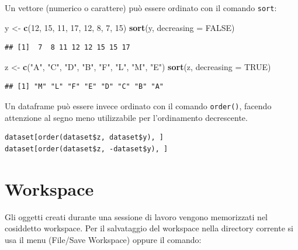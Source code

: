 \documentclass[a4paper,12pt,oneside]{book}
\newenvironment{Shaded}{\begin{snugshade}}{\end{snugshade}}
\newcommand{\KeywordTok}[1]{\textcolor[rgb]{0.13,0.29,0.53}{\textbf{#1}}}
\newcommand{\DataTypeTok}[1]{\textcolor[rgb]{0.13,0.29,0.53}{#1}}
\newcommand{\DecValTok}[1]{\textcolor[rgb]{0.00,0.00,0.81}{#1}}
\newcommand{\StringTok}[1]{\textcolor[rgb]{0.31,0.60,0.02}{#1}}
\newcommand{\OtherTok}[1]{\textcolor[rgb]{0.56,0.35,0.01}{#1}}
\newcommand{\NormalTok}[1]{#1}
\begin{document}
Un vettore (numerico o carattere) può essere ordinato con il comando
\texttt{sort}:

\begin{Shaded}
\begin{Highlighting}[]
\NormalTok{y  <-}\StringTok{  }\KeywordTok{c}\NormalTok{(}\DecValTok{12}\NormalTok{, }\DecValTok{15}\NormalTok{, }\DecValTok{11}\NormalTok{, }\DecValTok{17}\NormalTok{, }\DecValTok{12}\NormalTok{, }\DecValTok{8}\NormalTok{, }\DecValTok{7}\NormalTok{, }\DecValTok{15}\NormalTok{)}
\KeywordTok{sort}\NormalTok{(y, }\DataTypeTok{decreasing =} \OtherTok{FALSE}\NormalTok{)}
\end{Highlighting}
\end{Shaded}

\begin{verbatim}
## [1]  7  8 11 12 12 15 15 17
\end{verbatim}

\begin{Shaded}
\begin{Highlighting}[]
\NormalTok{z  <-}\StringTok{  }\KeywordTok{c}\NormalTok{(}\StringTok{"A"}\NormalTok{, }\StringTok{"C"}\NormalTok{, }\StringTok{"D"}\NormalTok{, }\StringTok{"B"}\NormalTok{, }\StringTok{"F"}\NormalTok{, }\StringTok{"L"}\NormalTok{, }\StringTok{"M"}\NormalTok{, }\StringTok{"E"}\NormalTok{)}
\KeywordTok{sort}\NormalTok{(z, }\DataTypeTok{decreasing =} \OtherTok{TRUE}\NormalTok{)}
\end{Highlighting}
\end{Shaded}

\begin{verbatim}
## [1] "M" "L" "F" "E" "D" "C" "B" "A"
\end{verbatim}

Un dataframe può essere invece ordinato con il comando \texttt{order()},
facendo attenzione al segno meno utilizzabile per l'ordinamento
decrescente.

\begin{verbatim}
dataset[order(dataset$z, dataset$y), ]
dataset[order(dataset$z, -dataset$y), ]
\end{verbatim}

\section{Workspace}\label{workspace}

Gli oggetti creati durante una sessione di lavoro vengono memorizzati
nel cosiddetto workspace. Per il salvataggio del workspace nella
directory corrente si usa il menu (File/Save Workspace) oppure il
comando:
\end{document}

